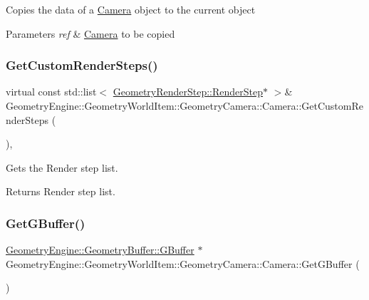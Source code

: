 Copies the data of a \mbox{\hyperlink{class_geometry_engine_1_1_geometry_world_item_1_1_geometry_camera_1_1_camera}{Camera}} object to the current object 
\begin{DoxyParams}{Parameters}
{\em ref} & \mbox{\hyperlink{class_geometry_engine_1_1_geometry_world_item_1_1_geometry_camera_1_1_camera}{Camera}} to be copied \\
\hline
\end{DoxyParams}
\mbox{\label{class_geometry_engine_1_1_geometry_world_item_1_1_geometry_camera_1_1_camera_a55464c946d6e07ea8f00f5236593ee5f}} 
\subsubsection{\texorpdfstring{GetCustomRenderSteps()}{GetCustomRenderSteps()}}
{\footnotesize\ttfamily virtual const std\+::list$<$ \mbox{\hyperlink{class_geometry_engine_1_1_geometry_render_step_1_1_render_step}{Geometry\+Render\+Step\+::\+Render\+Step}}$\ast$ $>$\& Geometry\+Engine\+::\+Geometry\+World\+Item\+::\+Geometry\+Camera\+::\+Camera\+::\+Get\+Custom\+Render\+Steps (\begin{DoxyParamCaption}{ }\end{DoxyParamCaption})\hspace{0.3cm}{\ttfamily [inline]}, {\ttfamily [virtual]}}

Gets the Render step list. \begin{DoxyReturn}{Returns}
Render step list. 
\end{DoxyReturn}
\mbox{\label{class_geometry_engine_1_1_geometry_world_item_1_1_geometry_camera_1_1_camera_a23673bed2b417962168e0bc5b8b37eb3}} 
\subsubsection{\texorpdfstring{GetGBuffer()}{GetGBuffer()}}
{\footnotesize\ttfamily \mbox{\hyperlink{class_geometry_engine_1_1_geometry_buffer_1_1_g_buffer}{Geometry\+Engine\+::\+Geometry\+Buffer\+::\+G\+Buffer}} $\ast$ Geometry\+Engine\+::\+Geometry\+World\+Item\+::\+Geometry\+Camera\+::\+Camera\+::\+Get\+G\+Buffer (\begin{DoxyParamCaption}{ }\end{DoxyParamCaption})\hspace{0.3cm}{\ttfamily [virtual]}}

